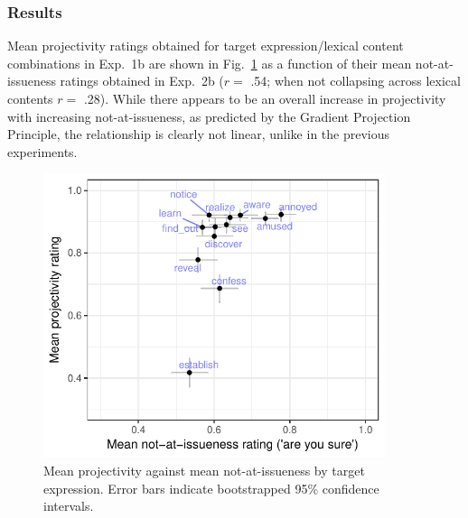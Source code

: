 \documentclass[11pt,fleqn]{article}
\newcommand{\6}{\mbox{$[\hspace*{-.6mm}[$}}
\newcommand{\9}{\mbox{$]\hspace*{-.6mm}]$}}
\newcommand{\figref}[1]{Fig.~\ref{#1}}
\begin{document}
\subsubsection{Results}

Mean projectivity ratings obtained for target expression/lexical content combinations in Exp.~1b are shown in \figref{fig:f-proj-ai-2b} as a function of their mean not-at-issueness ratings obtained in Exp.~2b ($r =$ .54; when not collapsing across lexical contents $r =$ .28). While there appears to be an overall increase in projectivity with increasing not-at-issueness, as predicted by the Gradient Projection Principle, the relationship is clearly not linear, unlike in the previous experiments.

\begin{figure}[!h]

\begin{center}
\includegraphics[width=10cm]{../results/exp2b/graphs/ai-proj-bytrigger-labels}
\end{center}

\caption{Mean projectivity against mean not-at-issueness by target expression. Error bars indicate bootstrapped 95\% confidence intervals.}
\label{fig:f-proj-ai-2b}
\end{figure}


%
%
%
%
%
\end{document}
